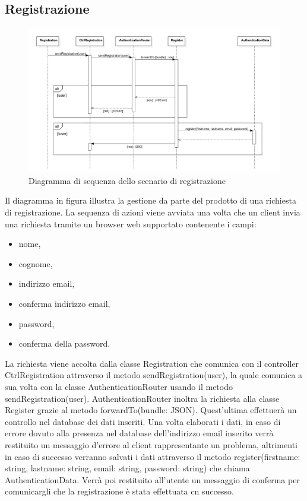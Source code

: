 \documentclass[a4paper, titlepage]{article}
\begin{document}
\newpage
\subsection{Registrazione}
\begin{figure}[!h]
	\centering
	\includegraphics[scale=0.5]{Img/seq-register.pdf}
	\caption{Diagramma di sequenza dello scenario di registrazione}
\end{figure}
Il diagramma in figura illustra la gestione da parte del prodotto di una richiesta di registrazione. La sequenza di azioni viene avviata una volta che un client invia una richiesta tramite un browser web supportato contenente i campi: 
\begin{itemize}
	\item nome,
	\item cognome,
	\item indirizzo email,
	\item conferma indirizzo email,
	\item password,
	\item conferma della password.
\end{itemize}
La richiesta viene accolta dalla classe Registration che comunica con il controller CtrlRegistration attraverso il metodo sendRegistration(user), la quale comunica a sua volta con la classe AuthenticationRouter usando il metodo sendRegistration(user).
AuthenticationRouter inoltra la richiesta alla classe Register grazie al metodo forwardTo(bundle: JSON). Quest'ultima effettuerà un controllo nel database dei dati inseriti. Una volta elaborati i dati, in caso di errore dovuto alla presenza nel database dell'indirizzo email inserito verrà restituito un messaggio d'errore al client rappresentante un problema, altrimenti in caso di successo verranno salvati i dati attraverso il metodo register(firstname: string, lastname: string, email: string, password: string) che chiama AuthenticationData. Verrà poi restituito all'utente un messaggio di conferma per comunicargli che la registrazione è stata effettuata cn successo.
\end{document}
